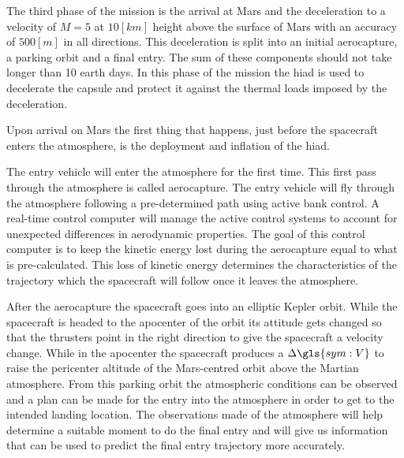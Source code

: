 The third phase of the mission is the arrival at Mars and the deceleration to a velocity of $M=5$ at $10 \left[km\right]$ height above the surface of Mars with an accuracy of $500 \left[m\right]$ in all directions. This deceleration is split into an initial aerocapture, a parking orbit and a final entry. The sum of these components should not take longer than 10 earth days. In this phase of the mission the \gls{hiad} is used to decelerate the capsule and protect it against the thermal loads imposed by the deceleration.

Upon arrival on Mars the first thing that happens, just before the spacecraft enters the atmosphere, is the deployment and inflation of the \gls{hiad}. %

The entry vehicle will enter the atmosphere for the first time. This first pass through the atmosphere is called aerocapture. The entry vehicle will fly through the atmosphere following a pre-determined path using active bank control. A real-time control computer will manage the active control systems to account for unexpected differences in aerodynamic properties. The goal of this control computer is to keep the kinetic energy lost during the aerocapture equal to what is pre-calculated. This loss of kinetic energy determines the characteristics of the trajectory which the spacecraft will follow once it leaves the atmosphere. %

After the aerocapture the spacecraft goes into an elliptic Kepler orbit. While the spacecraft is headed to the apocenter of the orbit its attitude gets changed so that the thrusters point in the right direction to give the spacecraft a velocity change. While in the apocenter the spacecraft produces a $\Delta\gls{sym:V}$ to raise the pericenter altitude of the Mars-centred orbit above the Martian atmosphere.
From this parking orbit the atmospheric conditions can be observed and a plan can be made for the entry into the atmosphere in order to get to the intended landing location. The observations made of the atmosphere will help determine a suitable moment to do the final entry and will give us information that can be used to predict the final entry trajectory more accurately.

